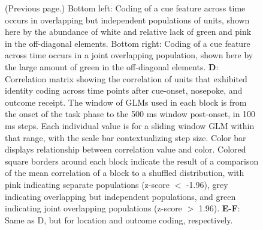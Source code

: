\documentclass[11pt]{article}
\newcommand{\bsf}[1]{\textbf{#1}}
\begin{document}
\addtocounter{figure}{-1}
\begin{figure} [t!]
  \caption{(Previous page.) Bottom left: Coding of a cue feature across time occurs in overlapping but independent populations of units, shown here by the abundance of white and relative lack of green and pink in the off-diagonal elements. Bottom right: Coding of a cue feature across time occurs in a joint overlapping population, shown here by the large amount of green in the off-diagonal elements. \bsf{D}: Correlation matrix showing the correlation of units that exhibited identity coding across time points after cue-onset, nosepoke, and outcome receipt. The window of GLMs used in each block is from the onset of the task phase to the 500 ms window post-onset, in 100 ms steps. Each individual value is for a sliding window GLM within that range, with the scale bar contextualizing step size. Color bar displays relationship between correlation value and color. Colored square borders around each block indicate the result of a comparison of the mean correlation of a block to a shuffled distribution, with pink indicating separate populations (z-score $<$ -1.96), grey indicating overlapping but independent populations, and green indicating joint overlapping populations (z-score $>$ 1.96). \bsf{E-F}: Same as D, but for location and outcome coding, respectively.}
\end{figure}
\end{document}
